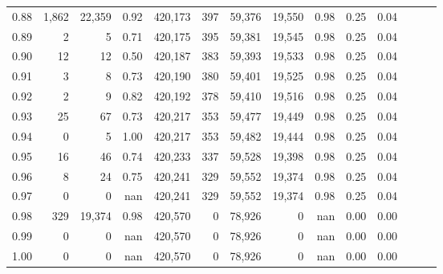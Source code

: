 \begin{tabular}{rrrrrrrrrrrrrr}
0.88 &   1,862 &  22,359 &  0.92 &  420,173 &      397 &  59,376 &  19,550 &  0.98 &  0.25 &      0.04 \\
0.89 &       2 &       5 &  0.71 &  420,175 &      395 &  59,381 &  19,545 &  0.98 &  0.25 &      0.04 \\
0.90 &      12 &      12 &  0.50 &  420,187 &      383 &  59,393 &  19,533 &  0.98 &  0.25 &      0.04 \\
0.91 &       3 &       8 &  0.73 &  420,190 &      380 &  59,401 &  19,525 &  0.98 &  0.25 &      0.04 \\
0.92 &       2 &       9 &  0.82 &  420,192 &      378 &  59,410 &  19,516 &  0.98 &  0.25 &      0.04 \\
0.93 &      25 &      67 &  0.73 &  420,217 &      353 &  59,477 &  19,449 &  0.98 &  0.25 &      0.04 \\
0.94 &       0 &       5 &  1.00 &  420,217 &      353 &  59,482 &  19,444 &  0.98 &  0.25 &      0.04 \\
0.95 &      16 &      46 &  0.74 &  420,233 &      337 &  59,528 &  19,398 &  0.98 &  0.25 &      0.04 \\
0.96 &       8 &      24 &  0.75 &  420,241 &      329 &  59,552 &  19,374 &  0.98 &  0.25 &      0.04 \\
0.97 &       0 &       0 &   nan &  420,241 &      329 &  59,552 &  19,374 &  0.98 &  0.25 &      0.04 \\
0.98 &     329 &  19,374 &  0.98 &  420,570 &        0 &  78,926 &       0 &   nan &  0.00 &      0.00 \\
0.99 &       0 &       0 &   nan &  420,570 &        0 &  78,926 &       0 &   nan &  0.00 &      0.00 \\
1.00 &       0 &       0 &   nan &  420,570 &        0 &  78,926 &       0 &   nan &  0.00 &      0.00 \\
\bottomrule
\end{tabular}

